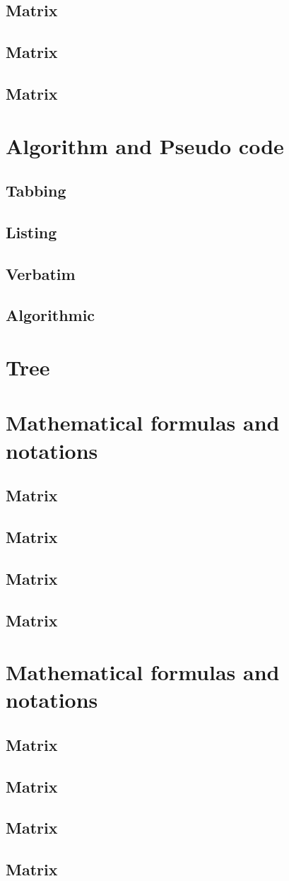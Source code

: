 \documentclass{article}
\begin{document}
\subsection{Matrix}
\subsection{Matrix}
\subsection{Matrix}

\section{Algorithm and Pseudo code} %
\subsection{Tabbing}
\subsection{Listing}
\subsection{Verbatim}
\subsection{Algorithmic}

\section{Tree} %

\section{Mathematical formulas and notations}
\subsection{Matrix}
\subsection{Matrix}
\subsection{Matrix}
\subsection{Matrix}

\section{Mathematical formulas and notations}
\subsection{Matrix}
\subsection{Matrix}
\subsection{Matrix}
\subsection{Matrix}
\end{document}
